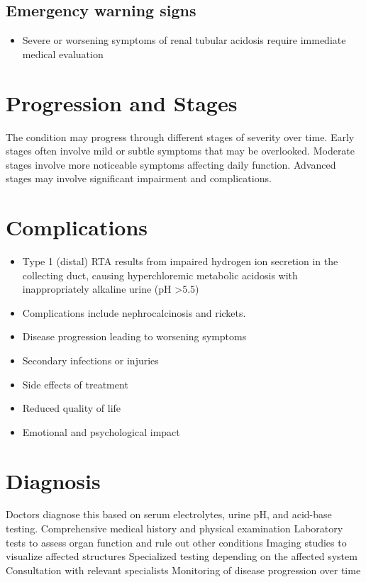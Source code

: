 \subsection{Emergency warning signs}
\begin{itemize}[noitemsep]
  \item Severe or worsening symptoms of renal tubular acidosis require immediate medical evaluation
\end{itemize}
\section{Progression and Stages}
The condition may progress through different stages of severity over time. Early stages often involve mild or subtle symptoms that may be overlooked. Moderate stages involve more noticeable symptoms affecting daily function. Advanced stages may involve significant impairment and complications.
\section{Complications}
\begin{itemize}[noitemsep]
  \item Type 1 (distal) RTA results from impaired hydrogen ion secretion in the collecting duct, causing hyperchloremic metabolic acidosis with inappropriately alkaline urine (pH >5.5)
  \item Complications include nephrocalcinosis and rickets.
  \item Disease progression leading to worsening symptoms
  \item Secondary infections or injuries
  \item Side effects of treatment
  \item Reduced quality of life
  \item Emotional and psychological impact
\end{itemize}
\section{Diagnosis}
Doctors diagnose this based on serum electrolytes, urine pH, and acid-base testing. Comprehensive medical history and physical examination Laboratory tests to assess organ function and rule out other conditions Imaging studies to visualize affected structures Specialized testing depending on the affected system Consultation with relevant specialists Monitoring of disease progression over time


